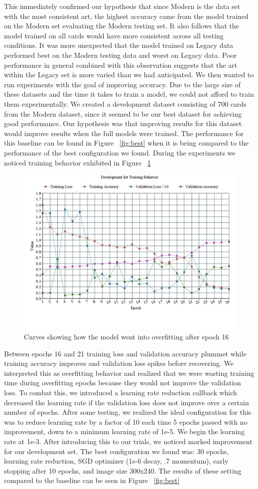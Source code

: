 \documentclass[letterpaper]{article} %
\begin{document}
This immediately confirmed our hypothesis that since Modern is the data set
with the most consistent art, the highest accuracy came from the model trained
on the Modern set evaluating the Modern testing set. It also follows that the
model trained on all cards would have more consistent across all
testing conditions. It was more unexpected that the model trained on Legacy
data performed best on the Modern testing data and worst on Legacy data. Poor
performance in general combined with this observation suggests that the art
within the Legacy set is more varied than we had anticipated.
We then wanted to run experiments with the goal of improving accuracy. Due to
the large size of these datasets and the time it takes to train a model, we
could not afford to train them experimentally. We created a development dataset
consisting of 700 cards from the Modern dataset, since it seemed to be our best
dataset for achieving good performance. Our hypothesis was that improving results
for this dataset would improve results when the full models were trained. The
performance for this baseline can be found in Figure ~\ref{fig:best} when it is being compared
to the performance of the best configuration we found.
During the experiments we noticed training behavior exhibited in Figure ~\ref{fig:overfitting}

\begin{figure}[h!]
  \includegraphics[width=.5\textwidth]{overfitting}
  \caption{Curves showing how the model went into overfitting after epoch 16}
  \label{fig:overfitting}
\end{figure}

Between epochs 16 and 21 training loss and validation accuracy plummet while
training accuracy improves and validation loss spikes before recovering. We
interpreted this as overfitting behavior and realized that we were wasting
training time during overfitting epochs because they would not improve the
validation loss. To combat this, we introduced a learning rate reduction
callback which decreased the learning rate if the validation loss does not
improve over a certain number of epochs. After some testing, we realized the
ideal configuration for this was to reduce learning rate by a factor of 10 each
time 5 epochs passed with no improvement, down to a minimum learning rate of
1e-5. We begin the learning rate at 1e-3.
After introducing this to our trials, we noticed marked improvement for our
development set. The best configuration we found was: 30 epochs, learning rate
reduction, SGD optimizer (1e-6 decay, .7 momentum), early stopping after 10
epochs, and image size 300x240. The results of these setting compared
to the baseline can be seen in Figure ~\ref{fig:best}
\end{document}
